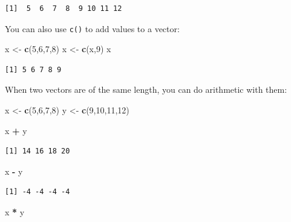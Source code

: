 \documentclass[
]{book}
\newenvironment{Shaded}{\begin{snugshade}}{\end{snugshade}}
\newcommand{\DecValTok}[1]{\textcolor[rgb]{0.00,0.00,0.81}{#1}}
\newcommand{\KeywordTok}[1]{\textcolor[rgb]{0.13,0.29,0.53}{\textbf{#1}}}
\newcommand{\NormalTok}[1]{#1}
\newcommand{\OperatorTok}[1]{\textcolor[rgb]{0.81,0.36,0.00}{\textbf{#1}}}
\newcommand{\StringTok}[1]{\textcolor[rgb]{0.31,0.60,0.02}{#1}}
\begin{document}
\begin{verbatim}
[1]  5  6  7  8  9 10 11 12
\end{verbatim}

You can also use \texttt{c()} to add values to a vector:

\begin{Shaded}
\begin{Highlighting}[]
\NormalTok{x <-}\StringTok{ }\KeywordTok{c}\NormalTok{(}\DecValTok{5}\NormalTok{,}\DecValTok{6}\NormalTok{,}\DecValTok{7}\NormalTok{,}\DecValTok{8}\NormalTok{)}
\NormalTok{x <-}\StringTok{ }\KeywordTok{c}\NormalTok{(x,}\DecValTok{9}\NormalTok{)}
\NormalTok{x}
\end{Highlighting}
\end{Shaded}

\begin{verbatim}
[1] 5 6 7 8 9
\end{verbatim}

When two vectors are of the same length, you can do arithmetic with them:

\begin{Shaded}
\begin{Highlighting}[]
\NormalTok{x <-}\StringTok{ }\KeywordTok{c}\NormalTok{(}\DecValTok{5}\NormalTok{,}\DecValTok{6}\NormalTok{,}\DecValTok{7}\NormalTok{,}\DecValTok{8}\NormalTok{)}
\NormalTok{y <-}\StringTok{ }\KeywordTok{c}\NormalTok{(}\DecValTok{9}\NormalTok{,}\DecValTok{10}\NormalTok{,}\DecValTok{11}\NormalTok{,}\DecValTok{12}\NormalTok{)}

\NormalTok{x }\OperatorTok{+}\StringTok{ }\NormalTok{y}
\end{Highlighting}
\end{Shaded}

\begin{verbatim}
[1] 14 16 18 20
\end{verbatim}

\begin{Shaded}
\begin{Highlighting}[]
\NormalTok{x }\OperatorTok{-}\StringTok{ }\NormalTok{y}
\end{Highlighting}
\end{Shaded}

\begin{verbatim}
[1] -4 -4 -4 -4
\end{verbatim}

\begin{Shaded}
\begin{Highlighting}[]
\NormalTok{x }\OperatorTok{*}\StringTok{ }\NormalTok{y}
\end{Highlighting}
\end{Shaded}
\end{document}
